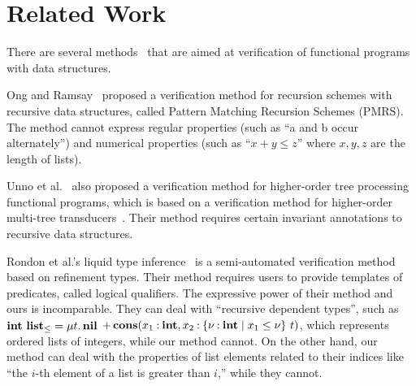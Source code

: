 \vspace{-5pt}
\section{Related Work}
\label{sec:related}

There are several
methods~\cite{Ong2011,Kobayashi2010,Unno2010,Rondon2008,Kawaguchi2009,Jhala2011,Xi1999,Unno2009,Xu2009,Xu2012,Chin2003}
that are aimed at verification of functional programs with data
structures.

Ong and Ramsay~\cite{Ong2011} proposed a verification method for
recursion schemes with recursive data structures, called Pattern Matching
Recursion Schemes (PMRS).  The method cannot express regular properties
(such as ``a and b occur alternately'') and numerical properties (such
as ``$x+y \leq z$'' where $x,y,z$ are the length of lists).

Unno et al.~\cite{Unno2010} also proposed a verification method for
higher-order tree processing functional programs, which is based on a
verification method for higher-order multi-tree
transducers~\cite{Kobayashi2010}. Their method requires certain
invariant annotations to recursive data structures.

Rondon et al.'s liquid type inference~\cite{Rondon2008,Kawaguchi2009} is a
semi-automated verification method based on refinement types.  Their method requires
users to provide templates of predicates, called logical qualifiers.  The
expressive power of their method and ours is incomparable.  They can
deal with ``recursive dependent types'', such as ${\mathbf{int}}~{\mathbf{list}_\leq}
= \mu t.\, \mathbf{nil}$ $\mathop{+}
\mathbf{cons}({x_1\mathbin{:}\mathbf{int}},{x_2\mathbin{:}{\{\nu\mathbin{:}\mathbf{int} \mid x_1 \leq \nu\}}~{t}})$,
which represents ordered lists of integers, while our method cannot. On
the other hand, our method can deal with the properties of list elements
related to their indices like ``the $i$-th element of a list is greater
than $i$,'' while they cannot.

